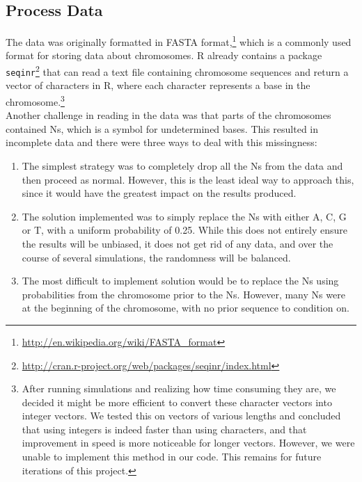 \documentclass[12pt]{article}
\begin{document}
\subsection{Process Data}
The data was originally formatted in FASTA format,\footnote{\url{http://en.wikipedia.org/wiki/FASTA_format}} which is a commonly used format for storing data about chromosomes. R already contains a package \texttt{seqinr}\footnote{\url{http://cran.r-project.org/web/packages/seqinr/index.html}} that can read a text file containing chromosome sequences and return a vector of characters in R, where each character represents a base in the chromosome.\footnote{After running simulations and realizing how time consuming they are, we decided it might be more efficient to convert these character vectors into integer vectors. We tested this on vectors of various lengths and concluded that using integers is indeed faster than using characters, and that improvement in speed is more noticeable for longer vectors. However, we were unable to implement this method in our code. This remains for future iterations of this project.}
\\[6pt]
Another challenge in reading in the data was that parts of the chromosomes contained Ns, which is a symbol for undetermined bases. This resulted in incomplete data and there were three ways to deal with this missingness:
\begin{enumerate}
\item The simplest strategy was to completely drop all the Ns from the data and then proceed as normal. However, this is the least ideal way to approach this, since it would have the greatest impact on the results produced.
\item The solution implemented was to simply replace the Ns with either A, C, G or T, with a uniform probability of 0.25. While this does not entirely ensure the results will be unbiased, it does not get rid of any data, and over the course of several simulations, the randomness will be balanced.
\item The most difficult to implement solution would be to replace the Ns using probabilities from the chromosome prior to the Ns. However, many Ns were at the beginning of the chromosome, with no prior sequence to condition on.
\end{enumerate}
\end{document}
